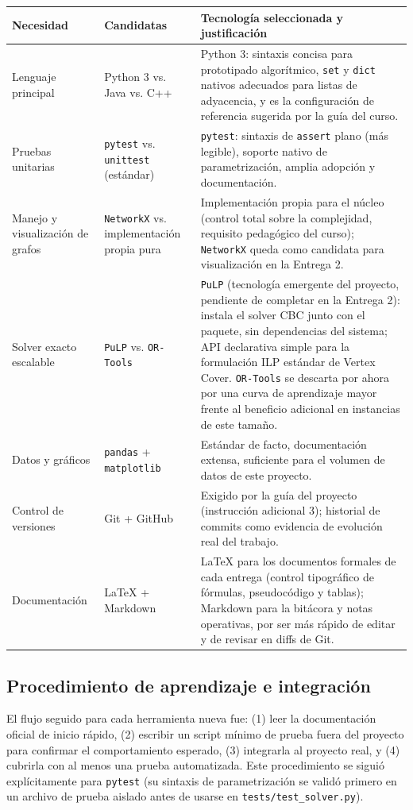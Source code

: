\documentclass[11pt,a4paper]{article}
\begin{document}
\begin{center}
\begin{tabular}{p{2.9cm}p{4.8cm}p{6.5cm}}
	\toprule
	\textbf{Necesidad} & \textbf{Candidatas} & \textbf{Tecnología seleccionada y justificación} \\
	\midrule
	Lenguaje principal &
		Python 3 vs. Java vs. C++ &
		Python 3: sintaxis concisa para prototipado algorítmico, \texttt{set} y \texttt{dict}
		nativos adecuados para listas de adyacencia, y es la configuración de referencia
		sugerida por la guía del curso. \\
	Pruebas unitarias &
		\texttt{pytest} vs. \texttt{unittest} (estándar) &
		\texttt{pytest}: sintaxis de \texttt{assert} plano (más legible), soporte nativo de
		parametrización, amplia adopción y documentación. \\
	Manejo y visualización de grafos &
		\texttt{NetworkX} vs. implementación propia pura &
		Implementación propia para el núcleo (control total sobre la complejidad, requisito
		pedagógico del curso); \texttt{NetworkX} queda como candidata para visualización en
		la Entrega 2. \\
	Solver exacto escalable &
		\texttt{PuLP} vs. \texttt{OR-Tools} &
		\texttt{PuLP} (tecnología emergente del proyecto, pendiente de completar en la
		Entrega 2): instala el solver CBC junto con el paquete, sin dependencias del
		sistema; API declarativa simple para la formulación ILP estándar de Vertex Cover.
		\texttt{OR-Tools} se descarta por ahora por una curva de aprendizaje mayor frente al
		beneficio adicional en instancias de este tamaño. \\
	Datos y gráficos &
		\texttt{pandas} + \texttt{matplotlib} &
		Estándar de facto, documentación extensa, suficiente para el volumen de datos de
		este proyecto. \\
	Control de versiones &
		Git + GitHub &
		Exigido por la guía del proyecto (instrucción adicional 3); historial de commits
		como evidencia de evolución real del trabajo. \\
	Documentación &
		\LaTeX{} + Markdown &
		\LaTeX{} para los documentos formales de cada entrega (control tipográfico de
		fórmulas, pseudocódigo y tablas); Markdown para la bitácora y notas operativas,
		por ser más rápido de editar y de revisar en diffs de Git. \\
	\bottomrule
\end{tabular}
\end{center}

\subsection{Procedimiento de aprendizaje e integración}
El flujo seguido para cada herramienta nueva fue: (1) leer la documentación oficial de
inicio rápido, (2) escribir un script mínimo de prueba fuera del proyecto para confirmar el
comportamiento esperado, (3) integrarla al proyecto real, y (4) cubrirla con al menos una
prueba automatizada. Este procedimiento se siguió explícitamente para \texttt{pytest} (su
sintaxis de parametrización se validó primero en un archivo de prueba aislado antes de
usarse en \texttt{tests/test\_solver.py}).
\end{document}
